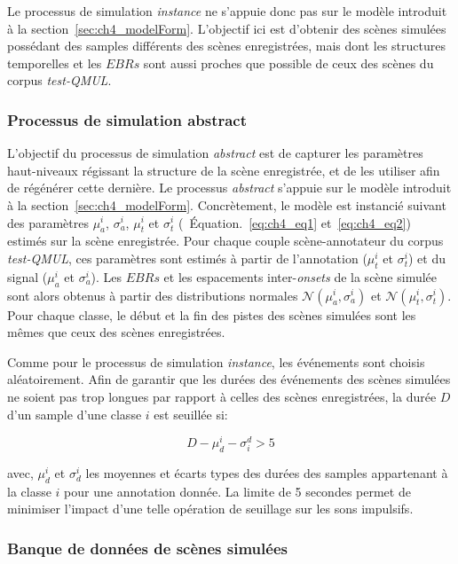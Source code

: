 Le processus de simulation \emph{instance} ne s'appuie donc pas sur le modèle introduit à la section~\ref{sec:ch4_modelForm}. L'objectif ici est d’obtenir des scènes simulées possédant des samples différents des scènes enregistrées, mais dont les structures temporelles et les $EBRs$ sont aussi proches que possible de ceux des scènes du corpus \emph{test-QMUL}.

\subsubsection{Processus de simulation abstract}
\label{sec:ch7_simuProcessAbstract}

L'objectif du processus de simulation \emph{abstract} est de capturer les paramètres haut-niveaux régissant la structure de la scène enregistrée, et de les utiliser afin de régénérer cette dernière. Le processus \emph{abstract} s'appuie sur le modèle introduit à la section~\ref{sec:ch4_modelForm}. Concrètement, le modèle est instancié suivant des paramètres $\mu^i_a$, $\sigma^i_a$, $\mu^i_t$ et $\sigma^i_t$ (\cf~Équation.~\ref{eq:ch4_eq1} et~\ref{eq:ch4_eq2}) estimés sur la scène enregistrée. Pour chaque couple scène-annotateur du corpus \emph{test-QMUL}, ces paramètres sont estimés à partir de l'annotation ($\mu^i_t$ et $\sigma^i_t$) et du signal ($\mu^i_a$ et $\sigma^i_a$). Les $EBRs$ et les espacements inter-\emph{onsets} de la scène simulée sont alors obtenus à partir des distributions normales $\mathcal{N}(\mu^i_a,\sigma^i_a)$ et $\mathcal{N}(\mu^i_t,\sigma^i_t)$. Pour chaque classe, le début et la fin des pistes des scènes simulées sont les mêmes que ceux des scènes enregistrées.

Comme pour le processus de simulation \emph{instance}, les événements sont choisis aléatoirement. Afin de garantir que les durées des événements des scènes simulées ne soient pas trop longues par rapport à celles des scènes enregistrées, la durée $D$ d'un sample d'une classe $i$ est seuillée si:

\begin{equation}
D-\mu^i_d-\sigma_i^d>5
\end{equation}

avec, $\mu^i_d$ et $\sigma^i_d$ les moyennes et écarts types des durées des samples appartenant à la classe $i$ pour une annotation donnée. La limite de 5 secondes permet de minimiser l'impact d'une telle opération de seuillage sur les sons impulsifs.

\subsubsection{Banque de données de scènes simulées}
\label{sec:ch7_datasetEtEbr}

